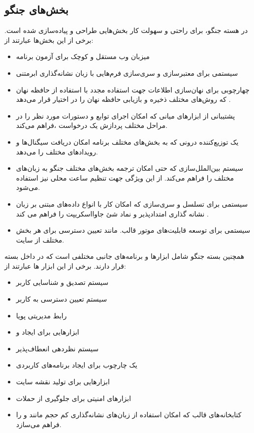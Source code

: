 {\subsection{بخش‌های جنگو}
در هسته جنگو، برای راحتی و سهولت کار بخش‌هایی طراحی و پیاده‌سازی شده است. برخی از 
این بخش‌ها عبارتند از:
\begin{itemize}
	\item میزبان وب مستقل و کوچک برای آزمون برنامه 
	\item سیستمی برای معتبرسازی و سری‌سازی فرم‌هایی با  زبان نشانه‌گذاری ابرمتنی
	\item چهارچوبی برای نهان‌سازی اطلاعات جهت استفاده مجدد با استفاده از حافظه نهان که روش‌های مختلف ذخیره و بازیابی حافظه نهان را در اختیار قرار می‌دهد .
	\item پشتیبانی از ابزارهای میانی که امکان اجرای توابع و دستورات مورد نظر را در مراحل مختلف پردازش یک درخواست ،فراهم می‌کند.
	\item یک توزیع‌کننده درونی که به بخش‌های مختلف برنامه امکان دریافت سیگنال‌ها و رویدادهای مختلف را می‌دهد.
	\item سیستم بین‌الملل‌سازی که حتی امکان ترجمه بخش‌های مختلف جنگو به زبان‌های مختلف را فراهم می‌کند. از این ویژگی جهت تنظیم ساعت محلی نیز استفاده می‌شود.
	\item  سیستمی برای تسلسل و سری‌سازی که امکان کار با انواع داده‌های مبتنی بر زبان نشانه گذاری امتدادپذیر و نماد شئ جاوااسکریپت را فراهم می کند .
	\item سیستمی برای توسعه قابلیت‌های موتور قالب. مانند تعیین دسترسی برای هر بخش مختلف از سایت.
\end{itemize}
 
همچنین بسته جنگو شامل ابزارها و برنامه‌های جانبی مختلفی است که در داخل بسته  قرار دارند. برخی از این ابزار ها عبارتند از:
\begin{itemize}
	\item سیستم تصدیق و شناسایی کاربر
	\item سیستم تعیین دسترسی به کاربر
	\item رابط مدیریتی پویا
	\item ابزارهایی برای ایجاد  و 
	\item سیستم نظر‌دهی انعطاف‌پذیر
	\item یک چارچوب برای ایجاد برنامه‌های کاربردی 
	\item ابزارهایی برای تولید نقشه سایت
	\item ابزارهای امنیتی برای جلوگیری از حملات 
	\item کتابخانه‌های قالب که امکان استفاده از زبان‌های نشانه‌گذاری کم حجم مانند  و  را فراهم می‌سازد.
\end{itemize}
 
}
